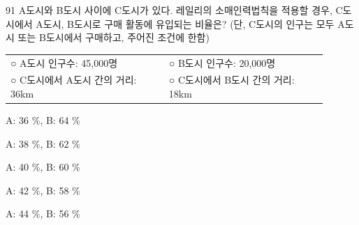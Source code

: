 \begin{question}{91}
A도시와 B도시 사이에 C도시가 있다. 레일리의 소매인력법칙을 적용할 경우, C도시에서 A도시, B도시로 구매 활동에 유입되는 비율은? (단, C도시의 인구는 모두 A도시 또는 B도시에서 구매하고, 주어진 조건에 한함)
\begin{framedtext}
\begin{tabular}{@{}p{0.45\linewidth}p{0.45\linewidth}@{}}
○ A도시 인구수: 45,000명 & ○ B도시 인구수: 20,000명 \\
○ C도시에서 A도시 간의 거리: 36km & ○ C도시에서 B도시 간의 거리: 18km
\end{tabular}
\end{framedtext}
\begin{choices}
  \item A: 36 \%, B: 64 \%
  \item A: 38 \%, B: 62 \%
  \item A: 40 \%, B: 60 \%
  \item A: 42 \%, B: 58 \%
  \item A: 44 \%, B: 56 \%
\end{choices}
\end{question}
